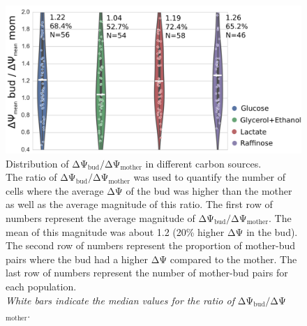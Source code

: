 %
%
\begin{figure}[htp]
	\centering
    \hspace*{1in}\includegraphics[width=.8\textwidth]{fraviol}
    \caption[Distribution of ΔΨ$_\mathrm{bud}/$ΔΨ$_\mathrm{mother}$ in different carbon sources]{Distribution of ΔΨ$_\mathrm{bud}/$ΔΨ$_\mathrm{mother}$ in different carbon sources.\\The ratio of ΔΨ$_\mathrm{bud}/$ΔΨ$_\mathrm{mother}$ was used to quantify the number of cells where the average ΔΨ of the bud was higher than the mother as well as the average magnitude of this ratio. The first row of numbers represent the average magnitude of ΔΨ$_\mathrm{bud}/$ΔΨ$_\mathrm{mother}$. The mean of this magnitude was about 1.2 (20\% higher ΔΨ in the bud). The second row of numbers represent the proportion of mother-bud pairs where the bud had a higher ΔΨ compared to the mother. The last row of numbers represent the number of mother-bud pairs for each population.\\\emph{White bars indicate the median values for the ratio of} ΔΨ$_\mathrm{bud}/$ΔΨ$_\mathrm{mother}$.}\label{fig:fraviol}
\end{figure}
%
